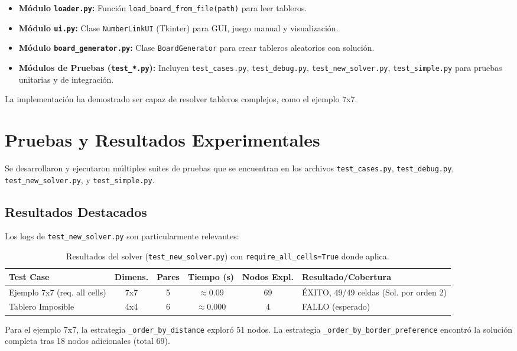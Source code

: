 \documentclass[spanish]{article}
\numberwithin{equation}{section}
\numberwithin{figure}{section}
\theoremstyle{definition}
\begin{document}
\begin{itemize}
    \item \textbf{Módulo \texttt{loader.py}:} Función \texttt{load\_board\_from\_file(path)} para leer tableros.

    \item \textbf{Módulo \texttt{ui.py}:} Clase \texttt{NumberLinkUI} (Tkinter) para GUI, juego manual y visualización.

    \item \textbf{Módulo \texttt{board\_generator.py}:} Clase \texttt{BoardGenerator} para crear tableros aleatorios con solución.

    \item \textbf{Módulos de Pruebas (\texttt{test\_*.py}):} Incluyen \texttt{test\_cases.py}, \texttt{test\_debug.py}, \texttt{test\_new\_solver.py}, \texttt{test\_simple.py} para pruebas unitarias y de integración.
\end{itemize}
La implementación ha demostrado ser capaz de resolver tableros complejos, como el ejemplo 7x7.

\section{Pruebas y Resultados Experimentales}
Se desarrollaron y ejecutaron múltiples suites de pruebas que se encuentran en los archivos \texttt{test\_cases.py}, \texttt{test\_debug.py}, \texttt{test\_new\_solver.py}, y \texttt{test\_simple.py}.

\subsection{Resultados Destacados}
Los logs de \texttt{test\_new\_solver.py} son particularmente relevantes:
\begin{table}[H]
\centering
\begin{tabular}{|p{3cm}|c|c|c|c|p{3.5cm}|}
\hline
\textbf{Test Case} & \textbf{Dimens.} & \textbf{Pares} & \textbf{Tiempo (s)} & \textbf{Nodos Expl.} & \textbf{Resultado/Cobertura} \\
\hline
Ejemplo 7x7 (req. all cells) & 7x7 & 5 & $\approx 0.09$ & 69 & ÉXITO, 49/49 celdas \newline (Sol. por orden 2) \\
\hline
Tablero Imposible & 4x4 & 6 & $\approx 0.000$ & 4 & FALLO (esperado) \\
\hline
\end{tabular}
\caption{Resultados del solver (\texttt{test\_new\_solver.py}) con \texttt{require\_all\_cells=True} donde aplica.}
\end{table}
Para el ejemplo 7x7, la estrategia \texttt{\_order\_by\_distance} exploró 51 nodos. La estrategia \texttt{\_order\_by\_border\_preference} encontró la solución completa tras 18 nodos adicionales (total 69).
\end{document}
